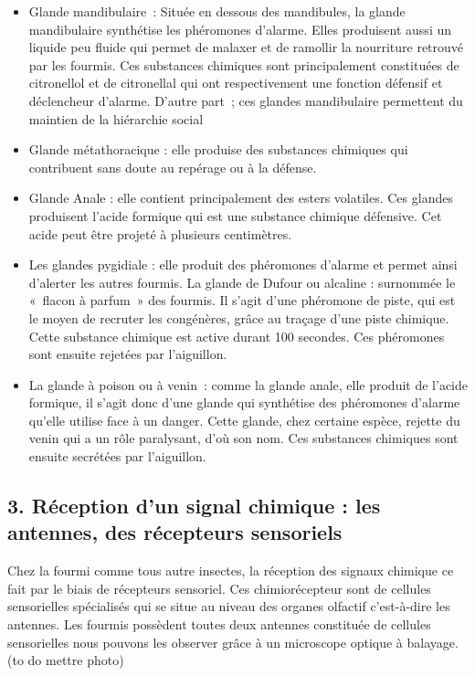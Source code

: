 \begin{itemize}
\item
  Glande mandibulaire~: Située en dessous des mandibules, la glande
  mandibulaire synthétise les phéromones d'alarme. Elles produisent
  aussi un liquide peu fluide qui permet de malaxer et de ramollir la
  nourriture retrouvé par les fourmis. Ces substances chimiques sont
  principalement constituées de citronellol et de citronellal qui ont
  respectivement une fonction défensif et déclencheur d'alarme. D'autre
  part~; ces glandes mandibulaire permettent du maintien de la
  hiérarchie social
\item
  Glande métathoracique : elle produise des substances chimiques qui
  contribuent sans doute au repérage ou à la défense.
\item
  Glande Anale : elle contient principalement des esters volatiles. Ces
  glandes produisent l'acide formique qui est une substance chimique
  défensive. Cet acide peut être projeté à plusieurs centimètres.
\item
  Les glandes pygidiale : elle produit des phéromones d'alarme et permet
  ainsi d'alerter les autres fourmis. La glande de Dufour ou alcaline :
  surnommée le «~flacon à parfum~» des fourmis. Il s'agit d'une
  phéromone de piste, qui est le moyen de recruter les congénères, grâce
  au traçage d'une piste chimique. Cette substance chimique est active
  durant 100 secondes. Ces phéromones sont ensuite rejetées par
  l'aiguillon.
\item
  La glande à poison ou à venin~: comme la glande anale, elle produit de
  l'acide formique, il s'agit donc d'une glande qui synthétise des
  phéromones d'alarme qu'elle utilise face à un danger. Cette glande,
  chez certaine espèce, rejette du venin qui a un rôle paralysant, d'où
  son nom. Ces substances chimiques sont ensuite secrétées par
  l'aiguillon.
\end{itemize}

\subsection{3. Réception d'un signal chimique : les antennes, des
récepteurs
sensoriels}\label{ruxe9ception-dun-signal-chimique-les-antennes-des-ruxe9cepteurs-sensoriels}

Chez la fourmi comme tous autre insectes, la réception des signaux
chimique ce fait par le biais de récepteurs sensoriel. Ces
chimiorécepteur sont de cellules sensorielles spécialisés qui se situe
au niveau des organes olfactif c'est-à-dire les antennes. Les fourmis
possèdent toutes deux antennes constituée de cellules sensorielles nous
pouvons les observer grâce à un microscope optique à balayage. (to do
mettre photo)

